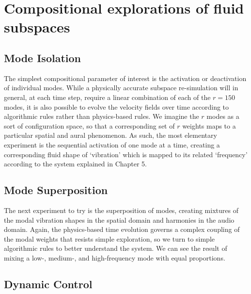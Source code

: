 \chapter[Compositional exploration of fluid subspaces]{Compositional explorations of fluid subspaces}
\label{chap:chap6}

\section{Mode Isolation}
The simplest compositional parameter of interest is the activation or deactivation of individual modes. While a physically accurate subspace re-simulation will in general, at each time step, require a linear combination of each of the $r = 150$ modes, it is also possible to evolve the velocity fields over time according to algorithmic rules rather than physics-based rules. We imagine the $r$ modes as a sort of configuration space, so that a corresponding set of $r$ weights maps to a particular spatial and aural phenomenon. As such, the most elementary experiment is the sequential activation of one mode at a time, creating a corresponding fluid shape of `vibration' which is mapped to its related `frequency' according to the system explained in Chapter 5.

\section{Mode Superposition}
The next experiment to try is the superposition of modes, creating mixtures of the modal vibration shapes in the spatial domain and harmonies in the audio domain. Again, the physics-based time evolution governs a complex coupling of the modal weights that resists simple exploration, so we turn to simple algorithmic rules to better understand the system. We can see the result of mixing a low-, medium-, and high-frequency mode with equal proportions.

\section{Dynamic Control}

